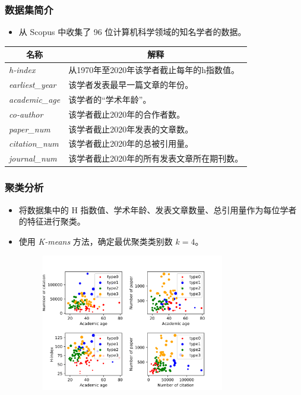 \documentclass[11pt,compress,t, xcolor=table]{beamer}
\begin{document}
\begin{frame}
	\frametitle{数据集简介}
	
\begin{itemize}
	\item 从 Scopus 中收集了 96 位计算机科学领域的知名学者的数据。
	\smallskip
\end{itemize}

\begin{table}[]
	\small
	\centering
	\begin{tabular}{|l|l|}
		\hline
		\multicolumn{1}{|c|}{名称}                 & \multicolumn{1}{c|}{解释}   \\ \hline
		\textit{h-index}        & 从1970年至2020年该学者截止每年的h指数值。 \\ \hline
		\textit{earliest\_year} & 该学者发表最早一篇文章的年份。           \\ \hline
		\textit{academic\_age}  & 该学者的“学术年龄”。               \\ \hline
		\textit{co-author}      & 该学者截止2020年的合作者数。          \\ \hline
		\textit{paper\_num}     & 该学者截止2020年发表的文章数。         \\ \hline
		\textit{citation\_num}  & 该学者截止2020年的总被引用量。         \\ \hline
		\textit{journal\_num}   & 该学者截止2020年的所有发表文章所在期刊数。   \\ \hline
	\end{tabular}
\end{table}

\end{frame}

\begin{frame}
	\frametitle{聚类分析}
	
\begin{itemize}
	\item 将数据集中的 H 指数值、学术年龄、发表文章数量、总引用量作为每位学者的特征进行聚类。
	\smallskip
	
	\item 使用 \textit{K-means} 方法，确定最优聚类类别数 $k=4$。
	\begin{figure}[H]
		\small
		\centering
		\includegraphics[width=8cm]{image/cluster_figure.png}
	\end{figure}
\end{itemize}

\end{frame}
\end{document}
